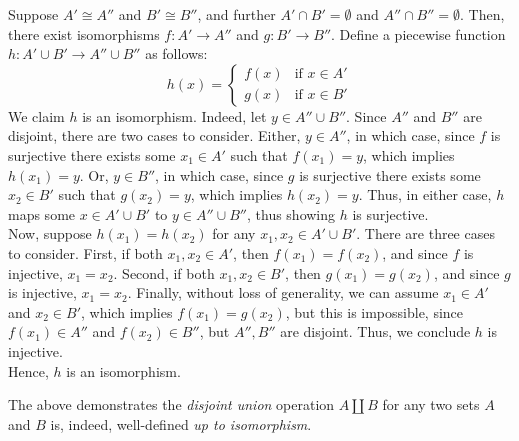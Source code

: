\begin{xca}
Suppose $A' \cong A''$ and $B' \cong B''$, and further $A' \cap B' = \emptyset$
and $A'' \cap B'' = \emptyset$. Then, there exist isomorphisms $f: A' \to A''$
and $g: B' \to B''$. Define a piecewise function $h: A' \cup B' \to A'' \cup
 B''$ as follows:
\[
    h(x) =
    \begin{cases}
        f(x) & \text{if } x \in A' \\
        g(x) & \text{if } x \in B'
    \end{cases}
\]
We claim $h$ is an isomorphism. Indeed, let $y \in A'' \cup B''$. Since $A''$
and $B''$ are disjoint, there are two cases to consider. Either, $y \in A''$,
in which case, since $f$ is surjective there exists some $x_1 \in A'$ such that
$f(x_1) = y$, which implies $h(x_1) = y$. Or, $y \in B''$, in which case, since
$g$ is surjective there exists some $x_2 \in B'$ such that $g(x_2) = y$, which
implies $h(x_2) = y$. Thus, in either case, $h$ maps some $x \in A' \cup B'$ to
$y \in A'' \cup B''$, thus showing $h$ is surjective.\\
Now, suppose $h(x_1) = h(x_2)$ for any $x_1, x_2 \in A' \cup B'$. There are
three cases to consider. First, if both $x_1, x_2 \in A'$, then $f(x_1) =
f(x_2)$, and since $f$ is injective, $x_1 = x_2$. Second, if both $x_1, x_2 \in
B'$, then $g(x_1) = g(x_2)$, and since $g$ is injective, $x_1 = x_2$. Finally,
without loss of generality, we can assume $x_1 \in A'$ and $x_2 \in B'$, which
implies $f(x_1) = g(x_2)$, but this is impossible, since $f(x_1) \in A''$ and
$f(x_2) \in B''$, but $A'', B''$ are disjoint. Thus, we conclude $h$ is
injective.\\
Hence, $h$ is an isomorphism.

The above demonstrates the \emph{disjoint union} operation $A \amalg B$ for any
two sets $A$ and $B$ is, indeed, well-defined \emph{up to isomorphism}.
\end{xca}
